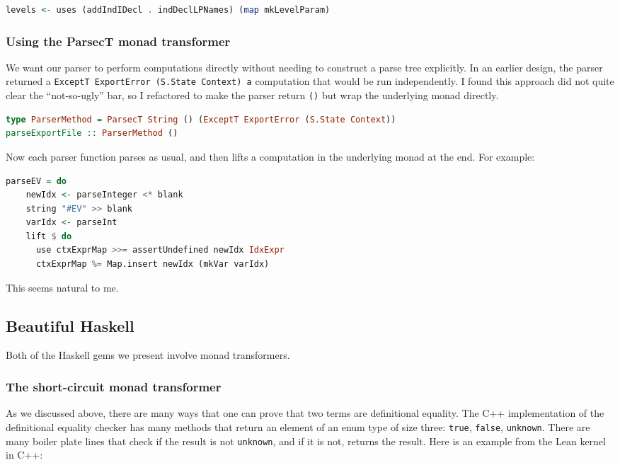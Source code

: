 \documentclass{article}
\begin{document}
\begin{spacing}{1.1}
\begin{lstlisting}[language=Haskell]
levels <- uses (addIndIDecl . indDeclLPNames) (map mkLevelParam)
\end{lstlisting}

\subsubsection{Using the ParsecT monad transformer}

We want our parser to perform computations directly without needing to construct a parse tree explicitly. In an earlier design, the parser returned a \lstinline{ExceptT ExportError (S.State Context) a} computation that would be run independently. I found this approach did not quite clear the ``not-so-ugly'' bar, so I refactored to make the parser return \lstinline{()} but wrap the underlying monad directly.
\begin{lstlisting}[language=Haskell]
type ParserMethod = ParsecT String () (ExceptT ExportError (S.State Context))
parseExportFile :: ParserMethod ()
\end{lstlisting}

Now each parser function parses as usual, and then lifts a computation in the underlying monad at the end. For example:
\begin{lstlisting}[language=Haskell]
  parseEV = do
    newIdx <- parseInteger <* blank
    string "#EV" >> blank
    varIdx <- parseInt
    lift $ do
      use ctxExprMap >>= assertUndefined newIdx IdxExpr
      ctxExprMap %= Map.insert newIdx (mkVar varIdx)
\end{lstlisting}

This seems natural to me.

\subsection{Beautiful Haskell}

Both of the Haskell gems we present involve monad transformers.

\subsubsection{The short-circuit monad transformer}

As we discussed above, there are many ways that one can prove that two terms are definitional equality. The C++ implementation of the definitional equality checker has many methods that return an element of an enum type of size three: \lstinline{true}, \lstinline{false}, \lstinline{unknown}. There are many boiler plate lines that check if the result is not \lstinline{unknown}, and if it is not, returns the result. Here is an example from the Lean kernel in C++:


\end{spacing}
\end{document}
